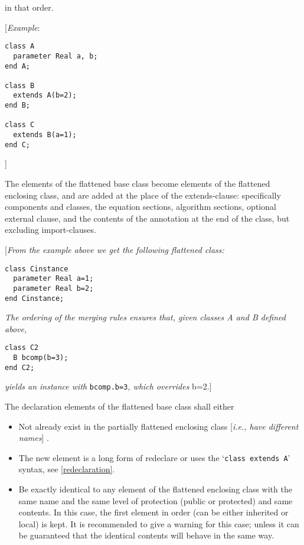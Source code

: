 in that order.

{[}\emph{Example}:
\begin{lstlisting}[language=modelica]
class A
  parameter Real a, b;
end A;

class B
  extends A(b=2);
end B;

class C
  extends B(a=1);
end C;
\end{lstlisting}
{]}

The elements of the flattened base class become elements of the
flattened enclosing class, and are added at the place of the
extends-clause: specifically components and classes, the equation
sections, algorithm sections, optional external clause, and the contents
of the annotation at the end of the class, but excluding import-clauses.

{[}\emph{From the example above we get the following flattened class:}
\begin{lstlisting}[language=modelica]
class Cinstance
  parameter Real a=1;
  parameter Real b=2;
end Cinstance;
\end{lstlisting}

\emph{The ordering of the merging rules ensures that, given classes A
and B defined above, }
\begin{lstlisting}[language=modelica]
class C2
  B bcomp(b=3);
end C2;
\end{lstlisting}

\emph{yields an instance with} \lstinline[basicstyle=\ttfamily]!bcomp.b=3!\emph{, which overrides} b=2.{]}

The declaration elements of the flattened base class shall either

\begin{itemize}
\item
  Not already exist in the partially flattened enclosing class
  {[}\emph{i.e., have different names}{]} .
\item
  The new element is a long form of redeclare or uses the `\lstinline[basicstyle=\ttfamily]!class extends A!' syntax, see \autoref{redeclaration}.
\item
  Be exactly identical to any element of the flattened enclosing class
  with the same name and the same level of protection (public or
  protected) and same contents. In this case, the first element in order
  (can be either inherited or local) is kept. It is recommended to give
  a warning for this case; unless it can be guaranteed that the
  identical contents will behave in the same way.
\end{itemize}


